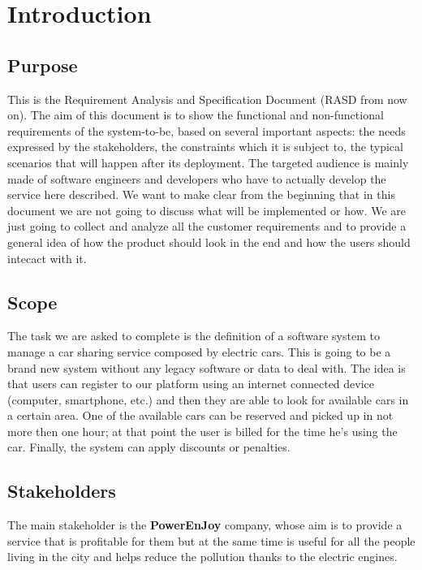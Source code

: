 \section{Introduction}

\subsection{Purpose}
    This is the Requirement Analysis and Specification Document (RASD from now on).
    The aim of this document is to show the functional and non-functional requirements
    of the system-to-be, based on several important aspects:
    the needs expressed by the stakeholders, the constraints which it is subject to,
    the typical scenarios that will happen after its deployment.
    The targeted audience is mainly made of software engineers and developers who have
    to actually develop the service here described.
    We want to make clear from the beginning that in this document we are not going to
    discuss what will be implemented or how. We are just going to collect and analyze
    all the customer requirements and to provide a general idea of how the product should
    look in the end and how the users should intecact with it.

\subsection{Scope}
    The task we are asked to complete is the definition of a software system to manage a car sharing
    service composed by electric cars. This is going to be a brand new system without any
    legacy software or data to deal with. The idea is that users can register to our platform
    using an internet connected device (computer, smartphone, etc.) and then they are able to
    look for available cars in a certain area. 
    One of the available cars can be reserved and picked up in not more then one hour; at that
    point the user is billed for the time he's using the car.
    Finally, the system can apply discounts or penalties.

\subsection{Stakeholders}
    The main stakeholder is the \textbf{PowerEnJoy} company, whose aim is to provide a service
    that is profitable for them but at the same time is useful for all the people living in the
    city and helps reduce the pollution thanks to the electric engines.

